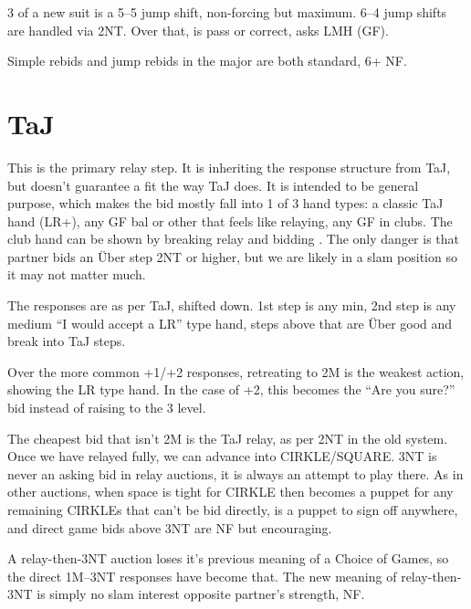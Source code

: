 \documentclass[tom-ari]{subfile}
\begin{document}
	3 of a new suit is a 5--5 jump shift, non-forcing but maximum. 6--4 jump shifts are handled via 2NT. Over that,  is pass or correct,  asks LMH (GF).
	
	Simple rebids and jump rebids in the major are both standard, 6+ NF.
		
	\section[2C TaJ]{ TaJ}
	
	This is the primary relay step.  It is inheriting the response structure from TaJ, but doesn't guarantee a fit the way TaJ does.  It is intended to be general purpose, which makes the bid mostly fall into 1 of 3 hand types:  a classic TaJ hand (LR+), any GF bal or other that feels like relaying, any GF in clubs.  The club hand can be shown by breaking relay and bidding . The only danger is that partner bids an \"Uber step 2NT or higher, but we are likely in a slam position so it may not matter much.
	
	The responses are as per TaJ, shifted down.  1st step is any min, 2nd step is any medium ``I would accept a LR'' type hand, steps above that are \"Uber good and break into TaJ steps.
	
	Over the more common +1/+2 responses, retreating to 2M is the weakest action, showing the LR type hand.  In the case of +2, this becomes the ``Are you sure?'' bid instead of raising to the 3 level.
	
	The cheapest bid that isn't 2M is the TaJ relay, as per 2NT in the old system.  Once we have relayed fully, we can advance into CIRKLE/SQUARE. 3NT is never an asking bid in relay auctions, it is always an attempt to play there. As in other auctions, when space is tight for CIRKLE then  becomes a puppet for any remaining CIRKLEs that can't be bid directly,  is a puppet to sign off anywhere, and direct game bids above 3NT are NF but encouraging.

	A relay-then-3NT auction loses it's previous meaning of a Choice of Games, so the direct 1M--3NT responses have become that. The new meaning of relay-then-3NT is simply no slam interest opposite partner's strength, NF.
	
	
\end{document}

